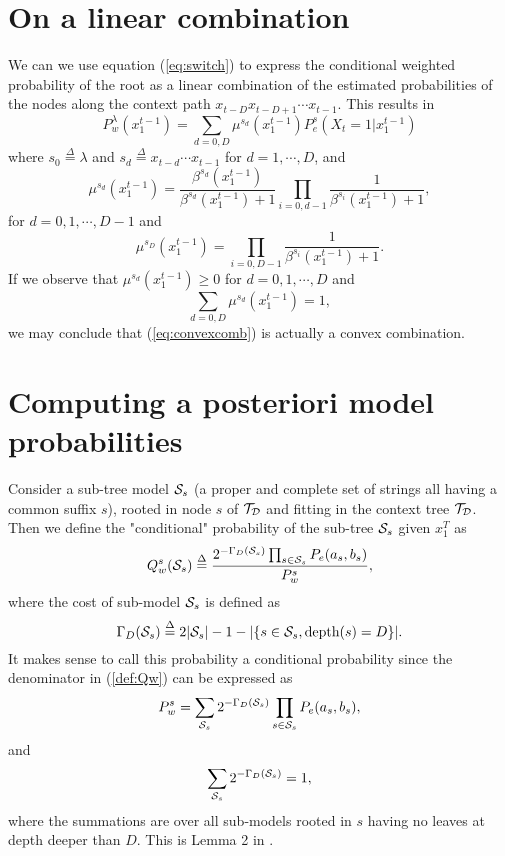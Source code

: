 \documentclass[10pt,conference]{IEEEtran}
\newcommand{\xT}{x^{T}_{1}}
\newcommand{\xtm}{x^{t-1}_{1}}
\newcommand{\cS}{{\cal{S}}}
\newcommand{\cTD}{{\cal{T}_{D}}}
\newcommand{\define}{\stackrel{\Delta}{=}}
\newcommand{\GD}{{\Gamma_{D}}}
\begin{document}
\section{On a linear combination}
We can we use equation (\ref{eq:switch}) to express the conditional weighted probability of the root as a linear combination of the estimated probabilities of the nodes along the context path $x_{t-D}x_{t-D+1}\cdots x_{t-1}$.
This results in
\begin{equation}\label{eq:convexcomb}
P_{w}^{\lambda}(\xtm) = \sum_{d=0,D} \mu^{s_d}(\xtm) P_{e}^{s}(X_t=1|\xtm)
\end{equation}
where $s_0\define\lambda$ and $s_d \define x_{t-d} \cdots x_{t-1}$ for $d=1,\cdots,D$, and
\begin{equation}
\mu^{s_{d}}(\xtm) = \frac{\beta^{s_d}(\xtm)}{\beta^{s_d}(\xtm)+1} \prod_{i=0,d-1} \frac{1} {\beta^{s_i}(\xtm)+1},\label{def:mua}
\end{equation}
for $d=0,1,\cdots,D-1$ and
\begin{equation}
\mu^{s_{D}}(\xtm) =  \prod_{i=0,D-1} \frac{1} {\beta^{s_i}(\xtm)+1}.\label{def:mub}
\end{equation}
If we observe that $\mu^{s_d}(\xtm) \geq 0$ for $d=0,1,\cdots,D$ and
\begin{equation}
\sum_{d=0,D} \mu^{s_d}(\xtm) = 1,
\end{equation}
we may conclude that (\ref{eq:convexcomb}) is actually a convex combination.

\section{Computing a posteriori model  probabilities}\label{sec:aposteriori}
Consider a sub-tree model $\cS_s$ (a proper and complete set of strings all having a common suffix $s$), rooted in node $s$ of $\cTD$ and fitting in the context tree $\cTD$.
Then we define the "conditional" probability of the sub-tree $\cS_{s}$ given $\xT$ as
\begin{equation}
Q_{w}^{s}(\cS_s) \define \frac{2^{-\GD(\cS_{s})} \prod_{s\in\cS_s} P_e( a_s,b_s) }{ P_{w}^{s} },\label{def:Qw}
\end{equation}
where the cost of sub-model $\cS_{s}$ is defined as
\begin{equation}
\GD(\cS_{s}) \define 2|\cS_{s}| - 1 - |\{ s\in\cS_{s}, \mbox{depth$(s) = D$} \}|. \label{def:subtreecost}
\end{equation}
It makes sense to call this probability a conditional probability since the denominator in (\ref{def:Qw}) can be expressed as
\begin{equation}
P^s_w = \sum_{\cS_{s}} 2^{-\GD(\cS_{s})} \prod_{s\in\cS_s} P_e( a_s,b_s),
\end{equation}
and
\begin{equation}
\sum_{\cS_{s}} 2^{-\GD(\cS_{s})} = 1,
\end{equation}
where the summations are over all sub-models rooted in $s$ having no leaves at depth deeper than $D$.
This is Lemma 2 in \cite{WilShtTja95}.
\end{document}
